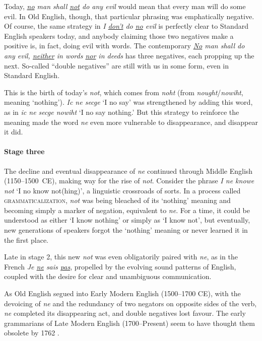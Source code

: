 Today, \textit{\uline{no} man shall \uline{not} do any evil} would mean that every man will do some evil. In Old English, though, that particular phrasing was emphatically negative. Of course, the same strategy in \textit{I \uline{don't} do \uline{no} evil} is perfectly clear to Standard English speakers today, and anybody claiming those two negatives make a positive is, in fact, doing evil with words. The contemporary \textit{\uline{No} man shall do any evil, \uline{neither} in words \uline{nor} in deeds} has three negatives, each propping up the next. So-called ``double negatives'' are still with us in some form, even in Standard English.

This is the birth of today's \textit{not}, which comes from \textit{noht} (from \textit{nought}/\textit{nowiht}, meaning `nothing').  \textit{Ic ne secge} `I no say' was strengthened by adding this word, as in \textit{ic ne secge nowiht} `I no say nothing.' But this  strategy to reinforce the meaning made the word \textit{ne} even more vulnerable to disappearance, and disappear it did. 

\paragraph{Stage three}

The decline and eventual disappearance of \textit{ne} continued through Middle English (1150--1500~CE), making way for the rise of \textit{not}. Consider the phrase \textit{I ne knowe not} `I no know not(hing)', a linguistic crossroads of sorts. In a process called \textsc{grammaticalization}, \textit{not} was being bleached of its `nothing' meaning and becoming simply a marker of negation, equivalent to \textit{ne}. For a time, it could be understood as either `I know nothing' or simply as `I know not', but eventually, new generations of speakers forgot the `nothing' meaning or never learned it in the first place.

Late in stage 2, this new \textit{not} was even obligatorily paired with \textit{ne}, as in the French \textit{Je \uline{ne} sais \uline{pas}}, propelled by the evolving sound patterns of English, coupled with the desire for clear and unambiguous communication.

As Old English segued into Early Modern English (1500--1700 CE), with the devoicing of \textit{ne} and the redundancy of two negators on opposite sides of the verb, \textit{ne} completed its disappearing act, and double negatives lost favour. The early grammarians of Late Modern English (1700--Present) seem to have thought them obsolete by 1762 \citep[365]{Gilman1989}.

